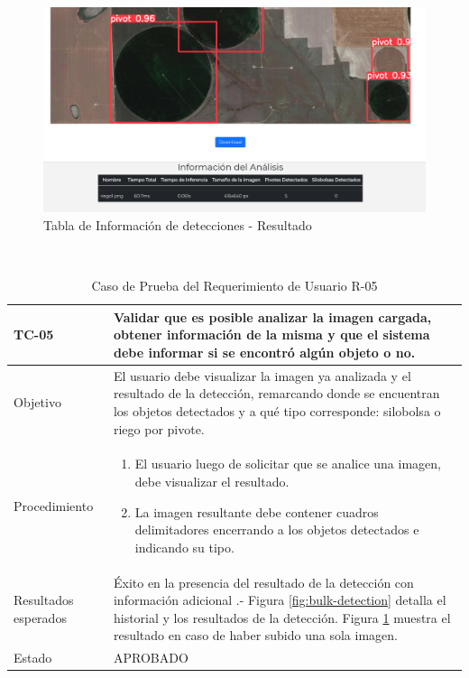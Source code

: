 \begin{figure}[h!]
    \centering
    \includegraphics[width=1\textwidth]{img/FE - detection info table.png}
    \caption{Tabla de Información de detecciones - Resultado}
    \label{fig:tabla result}
\end{figure}

\hfill \break
\\

\begin{table}[h!]
    \begin{tabular}{ | p{3cm} |p{9cm}| }
        \hline
        \rowcolor[HTML]{d6d8ff}
        TC-05 & Validar que es posible analizar la imagen cargada, obtener información de la misma y que el sistema debe informar si se encontró algún objeto o no.\\
        \hline
        Objetivo & El usuario debe visualizar la imagen ya analizada y el resultado de la detección, remarcando donde se encuentran los objetos detectados y a qué tipo corresponde: silobolsa o riego por pivote.\\
        \hline
        Procedimiento & \begin{enumerate}
            \item El usuario luego de solicitar que se analice una imagen, debe visualizar el resultado.
            \item La imagen resultante debe contener cuadros delimitadores encerrando a los objetos detectados e indicando su tipo.
        \end{enumerate}
        \\
        \hline
        Resultados esperados & Éxito en la presencia del resultado de la detección con información adicional .- Figura \ref{fig:bulk-detection} detalla el historial y los resultados de la detección. Figura \ref{fig:tabla result} muestra el resultado en caso de haber subido una sola imagen.\\
        \hline
        Estado & APROBADO \\
        \hline
    \end{tabular}\\
    \caption{Caso de Prueba del Requerimiento de Usuario R-05}
    \label{pruebar5}
\end{table}


